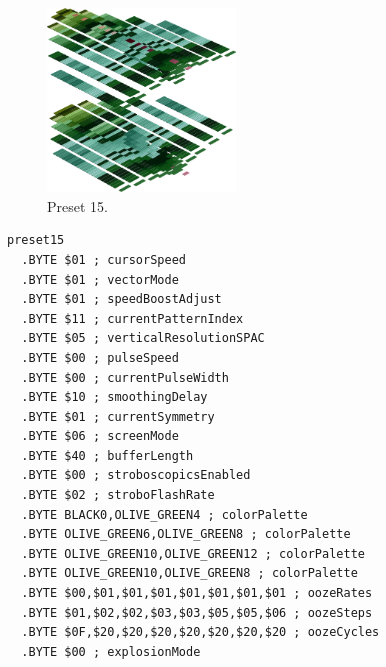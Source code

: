 \clearpage
\begin{minipage}[b]{0.48\linewidth}
\begin{figure}[H]                                                          
  \centering                                                             
  \begin{adjustbox}{width=5cm,center}                                   
  \includegraphics[width=5cm]{src/colorspace_presets/preset15-45.png}%
  \end{adjustbox}                                                        
\caption*{Preset 15.}                                           
\end{figure}                                                               
\end{minipage}
\hspace{0.1cm}
\begin{minipage}[b]{0.48\linewidth}                            
\begin{lstlisting}[basicstyle=\ttfamily\tiny]
preset15
  .BYTE $01 ; cursorSpeed
  .BYTE $01 ; vectorMode
  .BYTE $01 ; speedBoostAdjust
  .BYTE $11 ; currentPatternIndex
  .BYTE $05 ; verticalResolutionSPAC
  .BYTE $00 ; pulseSpeed
  .BYTE $00 ; currentPulseWidth
  .BYTE $10 ; smoothingDelay
  .BYTE $01 ; currentSymmetry
  .BYTE $06 ; screenMode
  .BYTE $40 ; bufferLength
  .BYTE $00 ; stroboscopicsEnabled
  .BYTE $02 ; stroboFlashRate
  .BYTE BLACK0,OLIVE_GREEN4 ; colorPalette
  .BYTE OLIVE_GREEN6,OLIVE_GREEN8 ; colorPalette
  .BYTE OLIVE_GREEN10,OLIVE_GREEN12 ; colorPalette
  .BYTE OLIVE_GREEN10,OLIVE_GREEN8 ; colorPalette
  .BYTE $00,$01,$01,$01,$01,$01,$01,$01 ; oozeRates
  .BYTE $01,$02,$02,$03,$03,$05,$05,$06 ; oozeSteps
  .BYTE $0F,$20,$20,$20,$20,$20,$20,$20 ; oozeCycles
  .BYTE $00 ; explosionMode
\end{lstlisting}
\end{minipage}

\vspace*{0.3cm}

